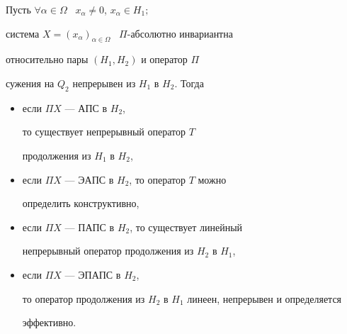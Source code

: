 \begin{prop}


Пусть $\forall\alpha \in\Omega$ \ $x_{\alpha}\neq 0$, $x_{\alpha}\in H_1;$


система $X=(x_{\alpha})_{\alpha\in\Omega}$ \ $\Pi$-абсолютно инвариантна 


относительно пары $(H_1, H_2)$ и оператор $\Pi$


сужения на $Q_2$ непрерывен из $H_1$ в $H_2$. Тогда


\begin{itemize}


\item[1)] если $\Pi X$ --- АПС в $H_2$,


то существует непрерывный оператор $T$


продолжения из $H_1$ в $H_2$,


\item[2)] если $\Pi X$ --- ЭАПС в $H_2$, то оператор $T$ можно


определить конструктивно,


\item[3)] если $\Pi X$ --- ПАПС в $H_2$, то существует линейный


непрерывный оператор продолжения из $H_2$ в $H_1$,


\item[4)] если $\Pi X$ --- ЭПАПС в $H_2$,


то оператор продолжения из $H_2$ в $H_1$ линеен, непрерывен и определяется


эффективно.


\end{itemize}


\end{prop}








